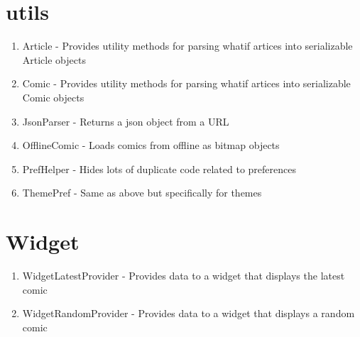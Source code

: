 \documentclass{article}
\begin{document}
\section{utils}
\begin{enumerate}
\item Article - Provides utility methods for parsing whatif artices into serializable Article objects
\item Comic - Provides utility methods for parsing whatif artices into serializable Comic objects
\item JsonParser - Returns a json object from a URL
\item OfflineComic - Loads comics from offline as bitmap objects
\item PrefHelper - Hides lots of duplicate code related to preferences
\item ThemePref - Same as above but specifically for themes
\end{enumerate}
\section{Widget}
\begin{enumerate}
\item WidgetLatestProvider - Provides data to a widget that displays the latest comic
\item WidgetRandomProvider - Provides data to a widget that displays a random comic
\end{enumerate}
\end{document}
